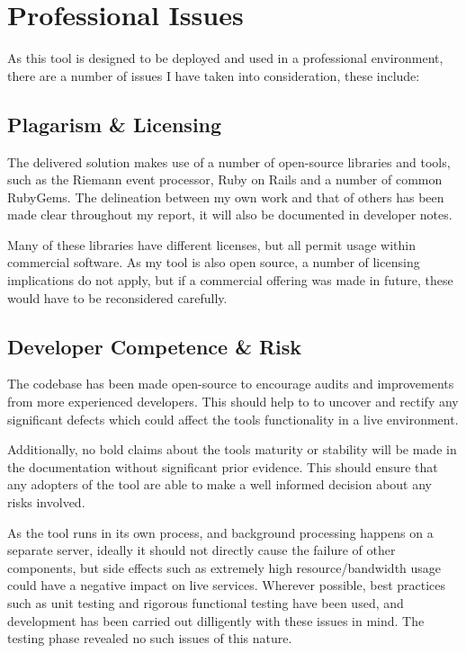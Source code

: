 \documentclass{cshonours}
\begin{document}
\pagebreak
\chapter{Professional Issues}

As this tool is designed to be deployed and used in a professional environment, there are a number of issues I have taken into consideration, these include:

\section{Plagarism \& Licensing}
    The delivered solution makes use of a number of open-source libraries and tools, such as the Riemann event processor, Ruby on Rails and a number of common RubyGems. The delineation between my own work and that of others has been made clear throughout my report, it will also be documented in developer notes.

    Many of these libraries have different licenses, but all permit usage within commercial software. As my tool is also open source, a number of licensing implications do not apply, but if a commercial offering was made in future, these would have to be reconsidered carefully.

\section{Developer Competence \& Risk}
    The codebase has been made open-source to encourage audits and improvements from more experienced developers. This should help to to uncover and rectify any significant defects which could affect the tools functionality in a live environment.

    Additionally, no bold claims about the tools maturity or stability will be made in the documentation without significant prior evidence. This should ensure that any adopters of the tool are able to make a well informed decision about any risks involved.

    As the tool runs in its own process, and background processing happens on a separate server, ideally it should not directly cause the failure of other components, but side effects such as extremely high resource/bandwidth usage could have a negative impact on live services. Wherever possible, best practices such as unit testing and rigorous functional testing have been used, and development has been carried out dilligently with these issues in mind. The testing phase revealed no such issues of this nature.
\end{document}
